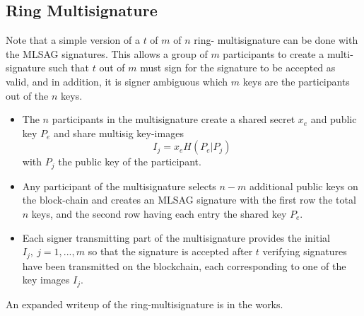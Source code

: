 \documentclass[12pt,english]{mrl}
\theoremstyle{definition}
\numberwithin{equation}{section}
\numberwithin{figure}{section}
\numberwithin{equation}{section}
\numberwithin{equation}{section}
\numberwithin{figure}{section}
\begin{document}
\subsection{Ring Multisignature}
Note that a simple version of a $t$ of $m$ of $n$ ring- multisignature can be done with the MLSAG signatures. This allows a group of $m$ participants to create a multi-signature such that $t$ out of $m$ must sign for the signature to be accepted as valid, and in addition, it is signer ambiguous which $m$ keys are the participants out of the $n$ keys. 
\begin{itemize}
 \item The $n$ participants in the multisignature create a shared secret $x_e$ and public key $P_e$ and share multisig key-images 
 \[
I_j = x_e H(P_e | P_j)
 \]
 with $P_j$ the public key of the participant. 
 \item Any participant of the multisignature selects $n-m$ additional public keys on the block-chain and creates an MLSAG signature with the first row the total $n$ keys, and the second row having each entry the shared key $P_e$. 
 \item Each signer transmitting part of the multisignature provides the initial $I_j,\ j=1,...,m$ so that the signature is accepted after $t$ verifying signatures have been transmitted on the blockchain, each corresponding to one of the key images $I_j$. 
\end{itemize}

An expanded writeup of the ring-multisignature is in the works. 
\end{document}
